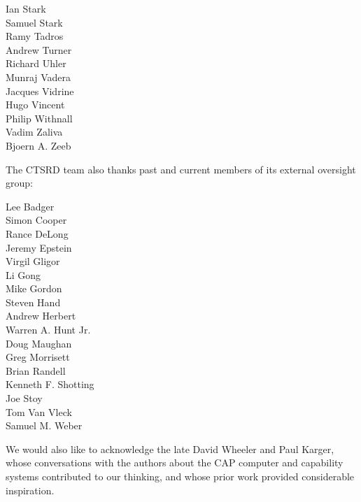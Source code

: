 \begin{small}
\begin{autogrid}{4}
Ian Stark \\
Samuel Stark \\
Ramy Tadros \\
Andrew Turner \\
Richard Uhler \\
Munraj Vadera \\
Jacques Vidrine \\
Hugo Vincent \\
Philip Withnall \\
Vadim Zaliva \\
Bjoern A. Zeeb \\
\end{autogrid}
\end{small}

\medskip

\noindent
The CTSRD team also thanks past and current members of its external oversight
group:

\medskip

\begin{small}
\noindent\begin{autogrid}{5}
Lee Badger \\
Simon Cooper \\
Rance DeLong \\
Jeremy Epstein \\
Virgil Gligor \\
Li Gong \\
Mike Gordon \\
Steven Hand \\
Andrew Herbert \\
Warren A. Hunt Jr. \\
Doug Maughan \\
Greg Morrisett \\
Brian Randell \\
Kenneth F. Shotting \\
Joe Stoy \\
Tom Van Vleck \\
Samuel M. Weber \\
\end{autogrid}
\end{small}

\medskip

\noindent
We would also like to acknowledge the late David Wheeler and Paul Karger,
whose conversations with the authors about the CAP computer and capability
systems contributed to our thinking, and whose prior work provided
considerable inspiration.

\medskip


